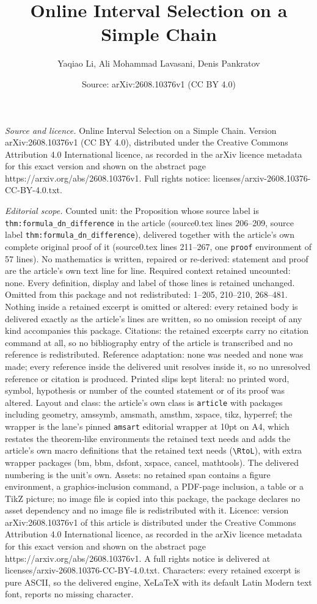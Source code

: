 \documentclass[10pt,a4paper]{amsart}
\title[Online Interval Selection on a Simple Chain]{Online Interval Selection on a Simple Chain}
\author{Yaqiao Li, Ali Mohammad Lavasani, Denis Pankratov}
\date{Source: arXiv:2608.10376v1 (CC BY 4.0)}
\begin{document}
\maketitle

\noindent\emph{Source and licence.} Online Interval Selection on a Simple Chain. Version arXiv:2608.10376v1 (CC BY 4.0), distributed under the Creative Commons Attribution 4.0 International licence, as recorded in the arXiv licence metadata for this exact version and shown on the abstract page https://arxiv.org/abs/2608.10376v1. Full rights notice: licenses/arxiv-2608.10376-CC-BY-4.0.txt.\par\smallskip

\noindent\textit{Editorial scope.} Counted unit: the Proposition whose source label is \texttt{thm:formula\_dn\_difference} in the article (source0.tex lines 206--209, source label \texttt{thm:formula\_dn\_difference}), delivered together with the article's own complete original proof of it (source0.tex lines 211--267, one \texttt{proof} environment of 57 lines). No mathematics is written, repaired or re-derived: statement and proof are the article's own text line for line. Required context retained uncounted: none. Every definition, display and label of those lines is retained unchanged. Omitted from this package and not redistributed: 1--205, 210--210, 268--481. Nothing inside a retained excerpt is omitted or altered: every retained body is delivered exactly as the article's lines are written, so no omission receipt of any kind accompanies this package. Citations: the retained excerpts carry no citation command at all, so no bibliography entry of the article is transcribed and no reference is redistributed. Reference adaptation: none was needed and none was made; every reference inside the delivered unit resolves inside it, so no unresolved reference or citation is produced. Printed slips kept literal: no printed word, symbol, hypothesis or number of the counted statement or of its proof was altered. Layout and class: the article's own class is \texttt{article} with packages including geometry, amssymb, amsmath, amsthm, xspace, tikz, hyperref; the wrapper is the lane's pinned \texttt{amsart} editorial wrapper at 10pt on A4, which restates the theorem-like environments the retained text needs and adds the article's own macro definitions that the retained text needs (\texttt{\textbackslash RtoL}), with extra wrapper packages (bm, bbm, dsfont, xspace, cancel, mathtools). The delivered numbering is the unit's own. Assets: no retained span contains a figure environment, a graphics-inclusion command, a PDF-page inclusion, a table or a TikZ picture; no image file is copied into this package, the package declares no asset dependency and no image file is redistributed with it. Licence: version arXiv:2608.10376v1 of this article is distributed under the Creative Commons Attribution 4.0 International licence, as recorded in the arXiv licence metadata for this exact version and shown on the abstract page https://arxiv.org/abs/2608.10376v1. A full rights notice is delivered at licenses/arxiv-2608.10376-CC-BY-4.0.txt. Characters: every retained excerpt is pure ASCII, so the delivered engine, XeLaTeX with its default Latin Modern text font, reports no missing character.
\end{document}
